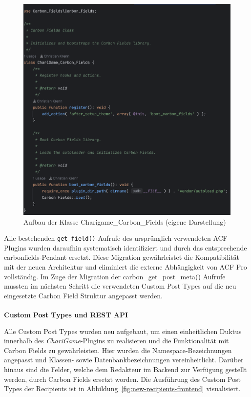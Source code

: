 \begin{figure}[H]
    \centering
    \includegraphics[width=1\textwidth]{images/carbon_fields_init}
    \caption{Aufbau der Klasse Charigame\_Carbon\_Fields (eigene Darstellung)}
    \label{fig:carbon-fields-init}
\end{figure}

Alle bestehenden \texttt{get\_field()}-Aufrufe des ursprünglich verwendeten ACF Plugins wurden daraufhin systematisch identifiziert und durch das entsprechende \gls{carbonfields}-Pendant ersetzt.
Diese Migration gewährleistet die Kompatibilität mit der neuen Architektur und eliminiert die externe Abhängigkeit von ACF Pro vollständig.
Im Zuge der Migration der carbon\_get\_post\_meta() Aufrufe mussten im nächsten Schritt die verwendeten Custom Post Types auf die neu eingesetzte Carbon Field Struktur angepasst werden.
\\\\
\textbf{Custom Post Types und REST API}

Alle Custom Post Types wurden neu aufgebaut, um einen einheitlichen Duktus innerhalb des \textit{ChariGame}-Plugins zu realisieren und die Funktionalität mit Carbon Fields zu gewährleisten.
Hier wurden die Namespace-Bezeichnungen angepasst und Klassen- sowie Datenbankbezeichnungen vereinheitlicht.
Darüber hinaus sind die Felder, welche dem Redakteur im Backend zur Verfügung gestellt werden, durch Carbon Fields ersetzt worden.
Die Ausführung des Custom Post Types der Recipients ist in Abbildung~\ref{fig:new-recipients-frontend} visualisiert.

